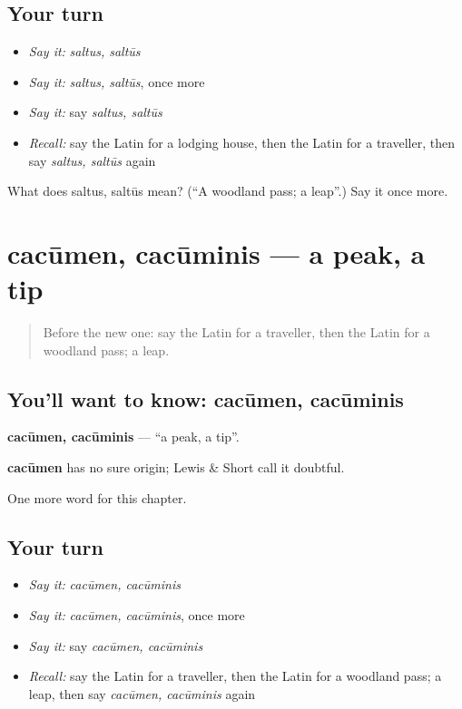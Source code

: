 \subsection*{Your turn}
\begin{itemize}
\raggedright
  \item \emph{Say it:} \emph{saltus, saltūs}
  \item \emph{Say it:} \emph{saltus, saltūs}, once more
  \item \emph{Say it:} say \emph{saltus, saltūs}
  \item \emph{Recall:} say the Latin for a lodging house, then the Latin for a traveller, then say \emph{saltus, saltūs} again
\end{itemize}

\begin{tcolorbox}[breakable,colback=teal!4,colframe=teal!35!black,title={Before you move on}]
What does saltus, saltūs mean? (\textquotedblleft{}A woodland pass; a leap\textquotedblright{}.) Say it once more.
\end{tcolorbox}
\section[cacūmen, cacūminis]{cacūmen, cacūminis — a peak, a tip}

\label{lesson:LA-C228-cacumen}



\begin{quote}
Before the new one: say the Latin for a traveller, then the Latin for a woodland pass; a leap.
\end{quote}

\subsection*{You'll want to know: cacūmen, cacūminis}
\textbf{cacūmen, cacūminis} — \textquotedblleft{}a peak, a tip\textquotedblright{}.

\begin{cousinweb}
\textbf{cacūmen} has no sure origin; Lewis \& Short call it doubtful.
\end{cousinweb}

\begin{grammarlens}[title={What you've built}]
One more word for this chapter.
\end{grammarlens}

\subsection*{Your turn}
\begin{itemize}
\raggedright
  \item \emph{Say it:} \emph{cacūmen, cacūminis}
  \item \emph{Say it:} \emph{cacūmen, cacūminis}, once more
  \item \emph{Say it:} say \emph{cacūmen, cacūminis}
  \item \emph{Recall:} say the Latin for a traveller, then the Latin for a woodland pass; a leap, then say \emph{cacūmen, cacūminis} again
\end{itemize}

